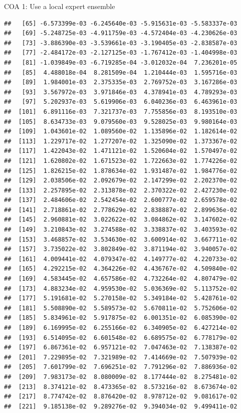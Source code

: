 \documentclass[ignorenonframetext,]{beamer}
\begin{document}
\begin{frame}[fragile]{COA 1: Use a local expert ensemble}
\begin{verbatim}
##   [65] -6.573399e-03 -6.245640e-03 -5.915631e-03 -5.583337e-03
##   [69] -5.248725e-03 -4.911759e-03 -4.572404e-03 -4.230626e-03
##   [73] -3.886390e-03 -3.539661e-03 -3.190405e-03 -2.838587e-03
##   [77] -2.484172e-03 -2.127125e-03 -1.767412e-03 -1.404998e-03
##   [81] -1.039849e-03 -6.719285e-04 -3.012032e-04  7.236201e-05
##   [85]  4.488018e-04  8.281509e-04  1.210444e-03  1.595716e-03
##   [89]  1.984001e-03  2.375335e-03  2.769752e-03  3.167286e-03
##   [93]  3.567972e-03  3.971846e-03  4.378941e-03  4.789293e-03
##   [97]  5.202937e-03  5.619906e-03  6.040236e-03  6.463961e-03
##  [101]  6.891116e-03  7.321737e-03  7.755856e-03  8.193510e-03
##  [105]  8.634733e-03  9.079560e-03  9.528025e-03  9.980164e-03
##  [109]  1.043601e-02  1.089560e-02  1.135896e-02  1.182614e-02
##  [113]  1.229717e-02  1.277207e-02  1.325090e-02  1.373367e-02
##  [117]  1.422043e-02  1.471121e-02  1.520604e-02  1.570497e-02
##  [121]  1.620802e-02  1.671523e-02  1.722663e-02  1.774226e-02
##  [125]  1.826215e-02  1.878634e-02  1.931487e-02  1.984776e-02
##  [129]  2.038506e-02  2.092679e-02  2.147299e-02  2.202370e-02
##  [133]  2.257895e-02  2.313878e-02  2.370322e-02  2.427230e-02
##  [137]  2.484606e-02  2.542454e-02  2.600777e-02  2.659578e-02
##  [141]  2.718861e-02  2.778629e-02  2.838887e-02  2.899636e-02
##  [145]  2.960881e-02  3.022622e-02  3.084862e-02  3.147602e-02
##  [149]  3.210843e-02  3.274588e-02  3.338837e-02  3.403593e-02
##  [153]  3.468857e-02  3.534630e-02  3.600914e-02  3.667711e-02
##  [157]  3.735022e-02  3.802849e-02  3.871194e-02  3.940057e-02
##  [161]  4.009441e-02  4.079347e-02  4.149777e-02  4.220733e-02
##  [165]  4.292215e-02  4.364226e-02  4.436767e-02  4.509840e-02
##  [169]  4.583445e-02  4.657586e-02  4.732264e-02  4.807479e-02
##  [173]  4.883234e-02  4.959530e-02  5.036369e-02  5.113752e-02
##  [177]  5.191681e-02  5.270158e-02  5.349184e-02  5.428761e-02
##  [181]  5.508890e-02  5.589573e-02  5.670811e-02  5.752606e-02
##  [185]  5.834961e-02  5.917875e-02  6.001351e-02  6.085390e-02
##  [189]  6.169995e-02  6.255166e-02  6.340905e-02  6.427214e-02
##  [193]  6.514095e-02  6.601548e-02  6.689575e-02  6.778179e-02
##  [197]  6.867361e-02  6.957121e-02  7.047463e-02  7.138387e-02
##  [201]  7.229895e-02  7.321989e-02  7.414669e-02  7.507939e-02
##  [205]  7.601799e-02  7.696251e-02  7.791296e-02  7.886936e-02
##  [209]  7.983173e-02  8.080009e-02  8.177444e-02  8.275481e-02
##  [213]  8.374121e-02  8.473365e-02  8.573216e-02  8.673674e-02
##  [217]  8.774742e-02  8.876420e-02  8.978712e-02  9.081617e-02
##  [221]  9.185138e-02  9.289276e-02  9.394034e-02  9.499411e-02

\end{verbatim}
\end{frame}
\end{document}
